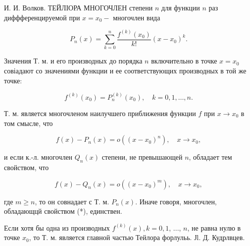 \documentclass[10pt]{article}
\begin{document}
И. И. Волков. ТЕЙЛІОРА МНОГОЧЛЕН степени $n$ для функции $n$ раз диффференцируемой при $x=x_{0}-$ многочлен вида



\[

P_{n}(x)=\sum_{k=0}^{n} \frac{f^{(k)}\left(x_{0}\right)}{k !}\left(x-x_{0}\right)^{k} .

\]



Значения Т. м. и его производных до порядка $n$ включительно в точке $x=x_{0}$ совіадают со значениями функции и ее соответствующих производных в той же точке:



\[

f^{(k)}\left(x_{0}\right)=P_{n}^{(k)}\left(x_{0}\right), \quad k=0,1, \ldots, n .

\]



Т. м. является многочленом наилучшего приближения функции $f$ при $x \rightarrow x_{0}$ в том смысле, что



\[

f(x)-P_{n}(x)=o\left(\left(x-x_{0}\right)^{n}\right), \quad x \longrightarrow x_{0},

\]



и если к.-л. многочлен $Q_{n}(x)$ степени, не превышающей $n$, обладает тем свойством, что



\[

f(x)-Q_{n}(x)=o\left(\left(x-x_{0}\right)^{m}\right), \quad x \longrightarrow x_{0},

\]



где $m \geqslant n$, то он совнадает с Т. м. $P_{n}(x)$. Иначе говоря, многочлен, обладающцй свойством (*), единствен.



Если хотя бы одна из производных $f^{(k)}(x), k=0,1$, ..., $n$, не равна нулю в точке $x_{0}$, то Т. м. является главной частью Тейлора форлульь. Јl. Д. Кудрлвцев.
\end{document}
